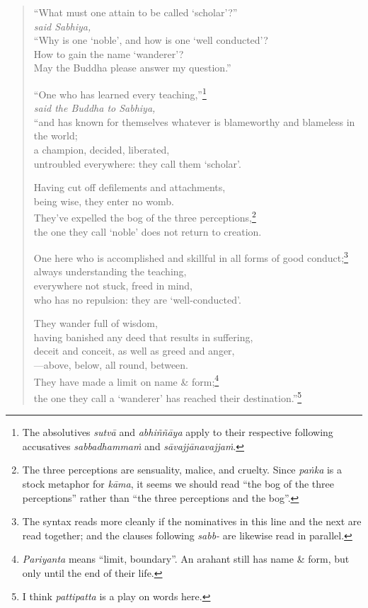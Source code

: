 \documentclass[12pt,openany]{book}%
\newcommand*{\scspeaker}[1]{\hspace{2em}\textit{#1}}
\begin{document}
\begin{verse}%
“What must one attain to be called ‘scholar’?” \\
\scspeaker{said Sabhiya, }\\
“Why is one ‘noble’, and how is one ‘well conducted’? \\
How to gain the name ‘wanderer’? \\
May the Buddha please answer my question.” 

“One who has learned every teaching,”\footnote{The absolutives \textit{\textsanskrit{sutvā}} and \textit{\textsanskrit{abhiññāya}} apply to their respective following accusatives \textit{\textsanskrit{sabbadhammaṁ}} and \textit{\textsanskrit{sāvajjānavajjaṁ}}. } \\
\scspeaker{said the Buddha to Sabhiya, }\\
“and has known for themselves whatever is blameworthy and blameless in the world; \\
a champion, decided, liberated, \\
untroubled everywhere: they call them ‘scholar’. 

Having cut off defilements and attachments, \\
being wise, they enter no womb. \\
They’ve expelled the bog of the three perceptions,\footnote{The three perceptions are sensuality, malice, and cruelty. Since \textit{\textsanskrit{paṅka}} is  a stock metaphor for \textit{\textsanskrit{kāma}}, it seems we should read “the bog of the three perceptions” rather than “the three perceptions and the bog”. } \\
the one they call ‘noble’ does not return to creation. 

One here who is accomplished and skillful in all forms of good conduct;\footnote{The syntax reads more cleanly if the nominatives in this line and the next are read together; and the clauses following \textit{sabb-} are likewise read in parallel. } \\
always understanding the teaching, \\
everywhere not stuck, freed in mind, \\
who has no repulsion: they are ‘well-conducted’. 

They wander full of wisdom, \\
having banished any deed that results in suffering, \\
deceit and conceit, as well as greed and anger, \\
—above, below, all round, between. \\
They have made a limit on name \& form;\footnote{\textit{Pariyanta} means “limit, boundary”. An arahant still has name \& form, but only until the end of their life. } \\
the one they call a ‘wanderer’ has reached their destination.”\footnote{I think \textit{pattipatta} is a play on words here. } 

%
\end{verse}
\end{document}
